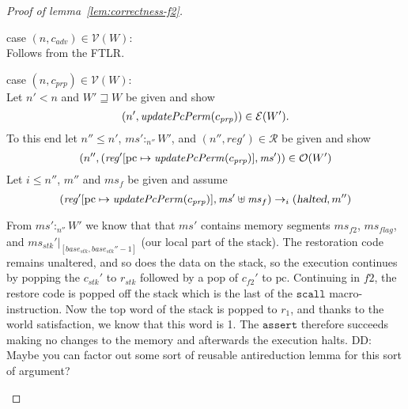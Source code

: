 \documentclass[a4paper]{article}
\newcommand{\update}[2]{[#1 \mapsto #2]}
\newcommand\dominique[1]{{\color{purple} \sf \footnotesize {DD: #1}}\\}
\newcommand{\var}[1]{\mathit{#1}}
\newcommand{\hs}{\var{ms}}
\newcommand{\ms}{\hs}
\newcommand{\pcreg}{\mathrm{pc}}
\newcommand{\start}{\var{base}}
\newcommand{\reg}{\var{reg}}
\newcommand{\heap}{\var{mem}}
\newcommand{\adv}{\var{adv}}
\newcommand{\stk}{\var{stk}}
\newcommand{\flag}{\var{flag}}
\newcommand{\halted}{\textsl{halted}}
\newcommand{\plainfun}[2]{
  \ifthenelse{\equal{#2}{}}
  {\mathit{#1}}
  {\mathit{#1}(#2)}
}
\newcommand{\updatePcPerm}[1]{\plainfun{updatePcPerm}{#1}}
\newcommand{\future}{\mathbin{\sqsupseteq}}
\newcommand{\heapSat}[3][\heap]{#1 :_{#2} #3}
\newcommand{\asmType}{\plaindom{AsmType}}
\newcommand{\plaindom}[1]{\mathrm{#1}}
\newcommand{\intr}[2]{\mathcal{#1}}
\newcommand{\valueintr}[1]{\intr{V}{#1}}
\newcommand{\exprintr}[1]{\intr{E}{#1}}
\newcommand{\regintr}[1]{\intr{R}{#1}}
\newcommand{\stdvr}{\valueintr{\asmType}}
\newcommand{\stder}{\exprintr{\asmType}}
\newcommand{\stdrr}{\regintr{\asmType}}
\newcommand{\observations}{\mathcal{O}}
\newcommand{\npair}[2][n]{\left(#1,#2 \right)}
\newcommand{\step}[1][]{\rightarrow_{#1}}
\begin{document}
\begin{proof}[Proof of lemma~\ref{lem:correctness-f2}]
\begin{enumproof}[resume]
\begin{enumproof}
                  \item case $\npair{c_\adv} \in \stdvr(W)$:\\
                    Follows from the FTLR.
                  \item case $\npair{c_{\var{prp}}} \in \stdvr(W)$: \label{f2:c-prp}\\
                    Let $n' < n$ and $W' \future W$ be given and show
                    \[
                      \npair[n']{\updatePcPerm{c_{\var{prp}}}} \in \stder(W').
                    \]
                    To this end let $n'' \leq n'$, $\heapSat[\ms']{n''}{W'}$, and $\npair[n'']{\reg'} \in \stdrr$ be given and show
                    \[
                      \npair[n'']{(\reg'\update{\pcreg}{\updatePcPerm{c_{\var{prp}}}},\ms')} \in \observations(W')
                    \]
                    Let $i \leq n''$, $m''$ and $\ms_f$ be given and assume
                    \[
                      (\reg'\update{\pcreg}{\updatePcPerm{c_{\var{prp}}}},\ms'\uplus\ms_f) \step[i]
                      (\halted,m'')
                    \]

                    From $\heapSat[\ms']{n''}{W'}$ we know that that $\ms'$ contains memory segments $\hs_{f2}$, $\hs_\flag$, and $\ms_\stk'|_{[\start_\stk, \start_\stk''-1]}$ (our local part of the stack). The restoration code remains unaltered, and so does the data on the stack, so the execution continues by popping the $c_\stk'$ to $r_\stk$ followed by a pop of $c_{f2}'$ to $\pcreg$. Continuing in $f2$, the restore code is popped off the stack which is the last of the $\mathtt{scall}$ macro-instruction. Now the top word of the stack is popped to $r_1$, and thanks to the world satisfaction, we know that this word is 1. The $\mathtt{assert}$ therefore succeeds making no changes to the memory and afterwards the execution halts.
                    \dominique{Maybe you can factor out some sort of reusable antireduction lemma
                      for this sort of argument?}


\end{enumproof}
\end{enumproof}
\end{proof}
\end{document}
